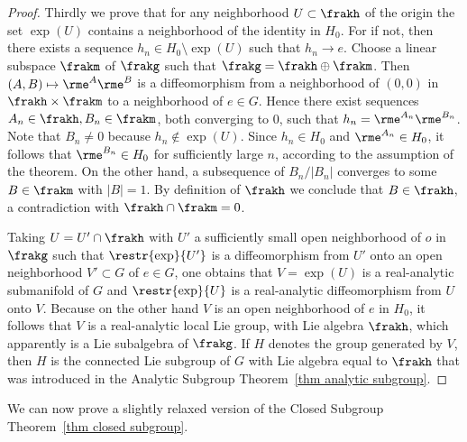 \begin{proof}
    Thirdly we prove that for any neighborhood $U\subset\frakh$ of the origin the set $\exp(U)$ contains a neighborhood of the identity in $H_0$. For if not, then there exists a sequence $h_n\in H_0\setminus \exp(U)$ such that $h_n\to e$. Choose a linear subspace $\frakm$ of $\frakg$ such that $\frakg=\frakh\oplus\frakm$. Then $(A,B)\mapsto \rme^A \rme^B$ is a diffeomorphism from a neighborhood of $(0,0)$ in $\frakh\times\frakm$ to a neighborhood of $e\in G$. Hence there exist sequences $A_n\in\frakh, B_n\in\frakm$, both converging to $0$, such that $h_n=\rme^{A_n}\rme^{B_n}$. Note that $B_n\neq 0$ because $h_n\notin \exp(U)$. Since $h_n\in H_0$ and $\rme^{A_n}\in H_0$, it follows that $\rme^{B_n}\in H_0$ for sufficiently large $n$, according to the assumption of the theorem. On the other hand, a subsequence of $B_n/|B_n|$ converges to some $B\in\frakm$ with $|B|=1$. By definition of $\frakh$ we conclude that $B\in\frakh$, a contradiction with $\frakh\cap\frakm=0$.

    Taking $U=U'\cap \frakh$ with $U'$ a sufficiently small open neighborhood of $o$ in $\frakg$ such that $\restr{\exp}{U'}$ is a diffeomorphism from $U'$ onto an open neighborhood $V'\subset G$ of $e\in G$, one obtains that $V=\exp(U)$ is a real-analytic submanifold of $G$ and $\restr{\exp}{U}$ is a real-analytic diffeomorphism from $U$ onto $V$. Because on the other hand $V$ is an open neighborhood of $e$ in $H_0$, it follows that $V$ is a real-analytic local Lie group, with Lie algebra $\frakh$, which apparently is a Lie subalgebra of $\frakg$. If $H$ denotes the group generated by $V$, then $H$ is the connected Lie subgroup of $G$ with Lie algebra equal to $\frakh$ that was introduced in the Analytic Subgroup Theorem~\ref{thm analytic subgroup}.
\end{proof}

We can now prove a slightly relaxed version of the Closed Subgroup Theorem~\ref{thm closed subgroup}.

